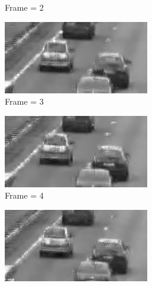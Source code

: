 \documentclass[a4paper, landscape]{article}
\begin{document}
\begin{figure}[H]
\begin{subfigure}{0.13\linewidth}
		\caption{Frame = 2}
	\end{subfigure}
	\begin{subfigure}{0.13\linewidth}
		\centering
		\includegraphics[width=\linewidth]{cars/reconstructed, T = 5, frame = 3.png}
		\caption{Frame = 3}
	\end{subfigure}
	\begin{subfigure}{0.13\linewidth}
		\centering
		\includegraphics[width=\linewidth]{cars/reconstructed, T = 5, frame = 4.png}
		\caption{Frame = 4}
	\end{subfigure}
	\begin{subfigure}{0.13\linewidth}
		\centering
		\includegraphics[width=\linewidth]{cars/reconstructed, T = 5, frame = 5.png}

\end{subfigure}
\end{figure}
\end{document}
